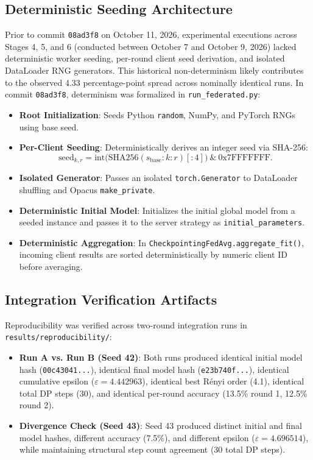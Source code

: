 \documentclass[11pt,a4paper]{article}
\begin{document}
\subsection{Deterministic Seeding Architecture}
Prior to commit \texttt{08ad3f8} on October 11, 2026, experimental executions across Stages 4, 5, and 6 (conducted between October 7 and October 9, 2026) lacked deterministic worker seeding, per-round client seed derivation, and isolated DataLoader RNG generators. This historical non-determinism likely contributes to the observed 4.33 percentage-point spread across nominally identical runs. In commit \texttt{08ad3f8}, determinism was formalized in \texttt{run\_federated.py}:
\begin{itemize}
    \item \textbf{Root Initialization}: Seeds Python \texttt{random}, NumPy, and PyTorch RNGs using base seed.
    \item \textbf{Per-Client Seeding}: Deterministically derives an integer seed via SHA-256:
    \begin{equation}
        \text{seed}_{k, r} = \text{int}\Big(\text{SHA256}(s_{\text{base}} : k : r)[:4]\Big) \ \& \ \text{0x7FFFFFFF}.
    \end{equation}
    \item \textbf{Isolated Generator}: Passes an isolated \texttt{torch.Generator} to DataLoader shuffling and Opacus \texttt{make\_private}.
    \item \textbf{Deterministic Initial Model}: Initializes the initial global model from a seeded instance and passes it to the server strategy as \texttt{initial\_parameters}.
    \item \textbf{Deterministic Aggregation}: In \texttt{CheckpointingFedAvg.aggregate\_fit()}, incoming client results are sorted deterministically by numeric client ID before averaging.
\end{itemize}

\subsection{Integration Verification Artifacts}
Reproducibility was verified across two-round integration runs in \texttt{results/reproducibility/}:
\begin{itemize}
    \item \textbf{Run A vs. Run B (Seed 42)}: Both runs produced identical initial model hash (\texttt{00c43041...}), identical final model hash (\texttt{e23b740f...}), identical cumulative epsilon ($\varepsilon = 4.442963$), identical best Rényi order (4.1), identical total DP steps (30), and identical per-round accuracy (13.5\% round 1, 12.5\% round 2).
    \item \textbf{Divergence Check (Seed 43)}: Seed 43 produced distinct initial and final model hashes, different accuracy (7.5\%), and different epsilon ($\varepsilon = 4.696514$), while maintaining structural step count agreement (30 total DP steps).
\end{itemize}
\end{document}
